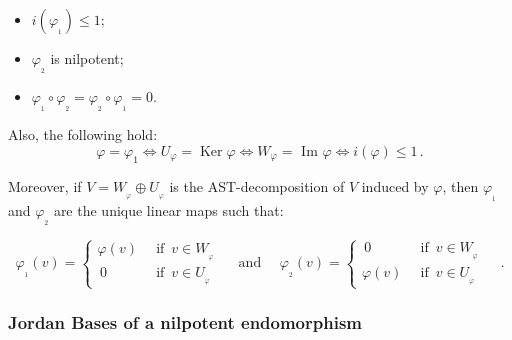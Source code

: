 \documentclass[10pt,a4paper]{amsart}
\theoremstyle{plain}
\theoremstyle{remark}
\numberwithin{equation}{section} \numberwithin{defn}{section}
\newcommand\Ker{\operatorname{Ker}}
\begin{document}
\begin{itemize}

\item $i(\varphi_{_1}) \leq 1$;

\item $\varphi_{_2}$ is nilpotent;

\item $\varphi_{_1} \circ \varphi_{_2} = \varphi_{_2} \circ \varphi_{_1} = 0$.

\end{itemize}

Also, the following hold:  \begin{equation} \label{eq:index1} \varphi = \varphi_1 \Longleftrightarrow U_\varphi = \Ker \varphi \Longleftrightarrow  W_\varphi = \text{ Im } \varphi  \Longleftrightarrow i(\varphi) \leq 1\, .\end{equation}

Moreover, if $V = W_{_\varphi}\oplus U_{_\varphi}$ is the AST-decomposition of $V$ induced by $\varphi$, then $\varphi_{_1}$ and $\varphi_{_2}$ are the unique linear maps such that:

\begin{equation} \label{eq:expl-CN-exp-3498353} \varphi_{_1} (v) = \left \{ \begin{aligned} \varphi (v) \, &\text{ if } \, v\in W_{_\varphi} \\ \, 0 \quad &\text{ if } \, v\in U_{_\varphi} \end{aligned} \right . \quad \text{ and } \quad \varphi_{_2} (v) = \left \{ \begin{aligned} \, 0 \quad &\text{ if } \, v\in W_{_\varphi} \\ \varphi (v) \, &\text{ if } \, v\in U_{_\varphi} \end{aligned} \right . \quad \, .\end{equation}

\medskip

\subsubsection{Jordan Bases of a nilpotent endomorphism} \label{ss:nilpotent-basis}
\end{document}

